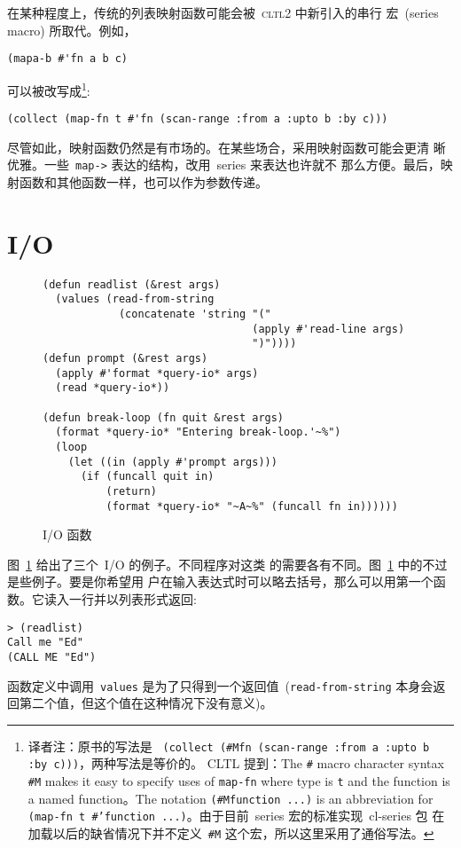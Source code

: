 在某种程度上，传统的列表映射函数可能会被~\textsc{cltl}2 中新引入的串行
宏~(series macro) 所取代。例如，
\begin{lstlisting}
(mapa-b #'fn a b c)
\end{lstlisting}
可以被改写成\footnote{译者注：原书的写法是
~\texttt{(collect (\#Mfn (scan-range :from a :upto b :by c)))}，两种写法是等价的。
CLTL 提到：The \texttt{\#} macro character syntax \texttt{\#M} makes it easy to
specify uses of \texttt{map-fn} where type is \texttt{t} and the function is
a named function。The notation \texttt{(\#Mfunction ...)} is an abbreviation
for \texttt{(map-fn t \#'function ...)}。由于目前~series 宏的标准实现~cl-series 包
在加载以后的缺省情况下并不定义~\texttt{\#M} 这个宏，所以这里采用了通俗写法。}:
\begin{lstlisting}
(collect (map-fn t #'fn (scan-range :from a :upto b :by c)))
\end{lstlisting}

尽管如此，映射函数仍然是有市场的。在某些场合，采用映射函数可能会更清
晰优雅。一些~\texttt{map->} 表达的结构，改用~series 来表达也许就不
那么方便。最后，映射函数和其他函数一样，也可以作为参数传递。

\section{I/O}
\label{sec:i/o}

\begin{figure}
\begin{lstlisting}
(defun readlist (&rest args)
  (values (read-from-string
            (concatenate 'string "("
                                 (apply #'read-line args)
                                 ")"))))
(defun prompt (&rest args)
  (apply #'format *query-io* args)
  (read *query-io*))

(defun break-loop (fn quit &rest args)
  (format *query-io* "Entering break-loop.'~%")
  (loop
    (let ((in (apply #'prompt args)))
      (if (funcall quit in)
          (return)
          (format *query-io* "~A~%" (funcall fn in))))))
\end{lstlisting}
\caption{\label{fig:i/o_functions}
  I/O 函数}
\end{figure}
图~\ref{fig:i/o_functions} 给出了三个~I/O \utility{}的例子。不同程序对这类\utility{}
的需要各有不同。图~\ref{fig:i/o_functions} 中的不过是些例子。要是你希望用
户在输入表达式时可以略去括号，那么可以用第一个函数。它读入一行并以列表形式返回:
\begin{lstlisting}
> (readlist)
Call me "Ed"
(CALL ME "Ed")
\end{lstlisting}
函数定义中调用~\texttt{values} 是为了只得到一个返回值~(\texttt{read-from-string}
本身会返回第二个值，但这个值在这种情况下没有意义)。

